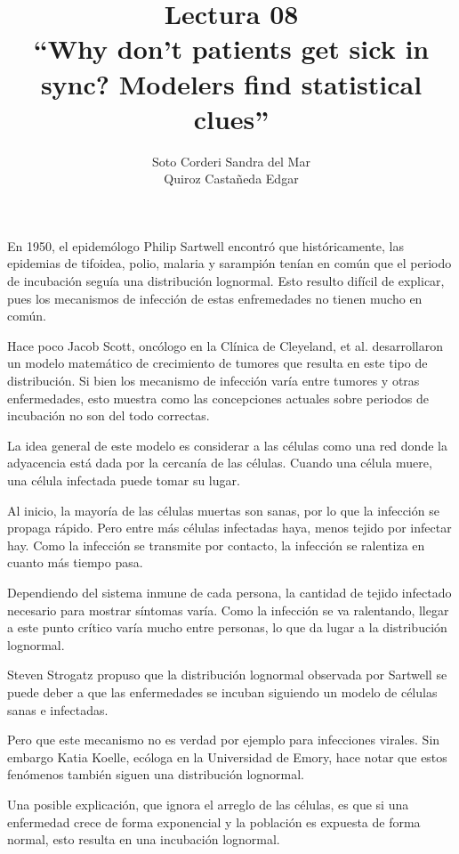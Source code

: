 \documentclass[12pt, letterpaper]{article}
\title{
    Lectura 08\\ 
    ``Why don't patients get sick in sync? Modelers find statistical clues''
}
\author{
    Soto Corderi Sandra del Mar\\
    Quiroz Castañeda Edgar \\
}
\begin{document}
    \maketitle

    En 1950, el epidemólogo Philip Sartwell encontró que históricamente, las
    epidemias de tifoidea, polio, malaria y sarampión tenían en común que el 
    periodo de incubación seguía una distribución lognormal. Esto resulto 
    difícil de explicar, pues los mecanismos de infección de estas enfremedades
    no tienen mucho en común.
    
    Hace poco Jacob Scott, oncólogo en la Clínica de Cleyeland, et al. 
    desarrollaron un modelo matemático de crecimiento de tumores que resulta en
    este tipo de distribución. Si bien los mecanismo de infección varía entre
    tumores y otras enfermedades, esto muestra como las concepciones actuales
    sobre periodos de incubación no son del todo correctas.

    La idea general de este modelo es considerar a las células como una red 
    donde la adyacencia está dada por la cercanía de las células. Cuando una 
    célula muere, una célula infectada puede tomar su lugar. 

    Al inicio, la mayoría de las células muertas son sanas, por lo que la 
    infección se propaga rápido. Pero entre más células infectadas haya, menos 
    tejido por infectar hay. Como la infección se transmite por contacto, la 
    infección se ralentiza en cuanto más tiempo pasa.

    Dependiendo del sistema inmune de cada persona, la cantidad de tejido 
    infectado necesario para mostrar síntomas varía. Como la infección se va 
    ralentando, llegar a este punto crítico varía mucho entre personas, lo que 
    da lugar a la distribución lognormal.

    Steven Strogatz propuso que la distribución lognormal observada por Sartwell
    se puede deber a que las enfermedades se incuban siguiendo un modelo de 
    células sanas e infectadas.

    Pero que este mecanismo no es verdad por ejemplo para infecciones virales.
    Sin embargo Katia Koelle, ecóloga en la Universidad de Emory, hace notar que
    estos fenómenos también siguen una distribución lognormal.

    Una posible explicación, que ignora el arreglo de las células, es que si una
    enfermedad crece de forma exponencial y la población es expuesta de forma
    normal, esto resulta en una incubación lognormal.
\end{document}

